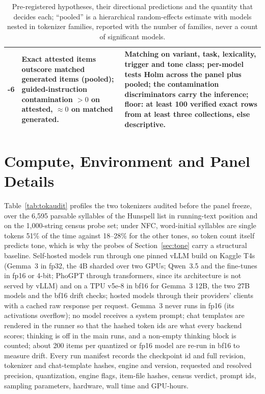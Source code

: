 \begin{table}[t]
\begin{tabular}{@{}lp{}p{}@{}}
    \hyp{6} & Exact attested items outscore matched generated items (pooled); guided-instruction contamination $> 0$ on attested, $\approx 0$ on matched generated. & Matching on variant, task, lexicality, trigger and tone class; per-model tests Holm across the panel plus pooled; the contamination discriminators carry the inference; floor: at least 100 verified exact rows from at least three collections, else descriptive. \\
    \bottomrule
  \end{tabular}
  \caption{Pre-registered hypotheses, their directional predictions and the quantity that decides each; ``pooled'' is a hierarchical random-effects estimate with models nested in tokenizer families, reported with the number of families, never a count of significant models.}
  \label{tab:hypotheses}
\end{table}

\section{Compute, Environment and Panel Details}
\label{app:compute}

Table~\ref{tab:tokaudit} profiles the two tokenizers audited before the panel freeze, over the 6,595 parsable syllables of the Hunspell list in running-text position and on the 1,000-string census probe set; under NFC, word-initial  syllables are single tokens 51\% of the time against 18--28\% for the other tones, so token count itself predicts tone, which is why the probes of Section~\ref{sec:tone} carry a structural baseline. Self-hosted models run through one pinned vLLM build on Kaggle T4s (Gemma~3 in fp32, the 4B sharded over two GPUs; Qwen~3.5 and the fine-tunes in fp16 or 4-bit; PhoGPT through transformers, since its architecture is not served by vLLM) and on a TPU v5e-8 in bf16 for Gemma~3 12B, the two 27B models and the bf16 drift checks; hosted models through their providers' clients with a cached raw response per request. Gemma~3 never runs in fp16 (its activations overflow); no model receives a system prompt; chat templates are rendered in the runner so that the hashed token ids are what every backend scores; thinking is off in the main runs, and a non-empty thinking block is counted; about 200 items per quantized or fp16 model are re-run in bf16 to measure drift. Every run manifest records the checkpoint id and full revision, tokenizer and chat-template hashes, engine and version, requested and resolved precision, quantization, engine flags, item-file hashes, census verdict, prompt ids, sampling parameters, hardware, wall time and GPU-hours. 

